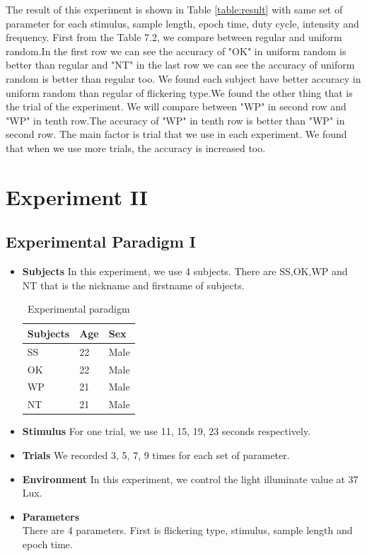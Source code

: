 The result of this experiment is shown in Table \ref{table:result} with same set of parameter for each stimulus, sample length, epoch time, duty cycle, intensity and frequency. First from the Table 7.2, we compare between regular and uniform random.In the first row we can see the accuracy of "OK" in uniform random is better than regular and "NT" in the last row we can see the accuracy of uniform random is better than regular too. We found each subject have better accuracy in uniform random than regular of flickering type.We found the other thing that is the trial of the experiment. We will compare between "WP" in second row and "WP" in tenth row.The accuracy of "WP" in tenth row is better than "WP" in second row. The main factor is trial that we use in each experiment. We found that when we use more trials, the accuracy is increased too.

\newpage
\section{Experiment II}
\subsection{Experimental Paradigm I}
\begin{itemize}
\item{\textbf{Subjects}}\newline
In this experiment, we use 4 subjects. There are SS,OK,WP and NT that is the nickname and firstname of subjects.


\begin{table}[ht]
\centering
\begin{tabular}{| P{.2\linewidth} | P{.2\linewidth} | P{.2\linewidth} |}
			\hline 
			\textbf{Subjects} & \textbf{Age}  & \textbf{Sex}\\
			\hline 
			SS & 22 & Male\\
			\hline 
			OK & 22 & Male\\
			\hline 
			WP & 21 & Male\\
			\hline 
			NT & 21 & Male\\
			\hline
		\end{tabular}       
\caption{Experimental paradigm}
\label{table:2}
\end{table}

\item{\textbf{Stimulus}}
For one trial, we use 11, 15, 19, 23 seconds respectively.
\item{\textbf{Trials}}
We recorded 3, 5, 7, 9 times for each set of parameter.
\item{\textbf{Environment}}
In this experiment, we control the light illuminate value at 37 Lux.
	\item{\textbf{Parameters}}\\
There are 4 parameters. First is flickering type, stimulus, sample length and epoch time.
\end{itemize}

